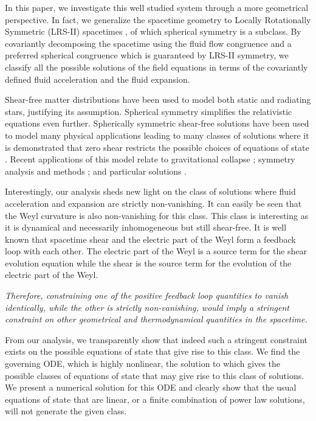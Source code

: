 \documentclass[abstract=on,notitlepage,superscriptaddress,nofootinbib,aps,showpacs,twocolumn,prd]{revtex4}
\newcommand{\0}{^{(0)}}
\newcommand{\1}{^{(1)}}
\newcommand{\2}{^{(2)}}
\newcommand{\3}{{}^{(3)}}
\begin{document}
In this paper, we investigate this well studied system through a more geometrical perspective. In fact, we generalize the spacetime geometry to Locally Rotationally Symmetric (LRS-II) spacetimes \cite{vanElstEllis}, of which spherical symmetry is a subclass. By covariantly decomposing the spacetime using the fluid flow congruence and a preferred spherical congruence which is guaranteed by LRS-II symmetry, we classify all the possible solutions of the field equations in terms of the covariantly defined fluid acceleration and the fluid expansion. 

Shear-free matter distributions have been used to model both static and radiating stars, justifying its assumption. Spherical symmetry simplifies the relativistic equations even further. Spherically symmetric shear-free solutions have been used to model many physical applications leading to many classes of solutions \cite{stephani, srivastava, deng, sussman1, sussman2, maharaj1, havas, maharaj2} where it is demonstrated that zero shear restricts the possible choices of equations of state \cite{sussman1,  sussman2}. Recent applications of this model relate to gravitational collapse \cite{sharif, pinheiro, naidu, charan}; symmetry analysis \cite{wafo, gumede} and methods \cite{msomi, moopanar}; and particular solutions \cite{wagh, bhatti, shah}.

Interestingly, our analysis sheds new light on the class of solutions where fluid acceleration and expansion are strictly non-vanishing. It can easily be seen that the Weyl curvature is also non-vanishing for this class. This class is interesting as it is dynamical and necessarily inhomogeneous but still shear-free. It is well known that spacetime shear and the electric part of the Weyl form a feedback loop with each other. The electric part of the Weyl is a source term for the shear evolution equation while the shear is the source term for the evolution of the electric part of the Weyl. 

\emph{Therefore, constraining one of the positive feedback loop quantities to vanish identically, while the other is strictly non-vanishing, would imply a stringent constraint on other geometrical and thermodynamical quantities in the spacetime.} 

From our analysis, we transparently show that indeed such a stringent constraint exists on the possible equations of state that give rise to this class. We find the governing ODE, which is highly nonlinear, the solution to which gives the possible classes of equations of state that may give rise to this class of solutions. We present a numerical solution for this ODE and clearly show that the usual equations of state that are linear, or a finite combination of power law solutions, will not generate the given class. 
\end{document}
